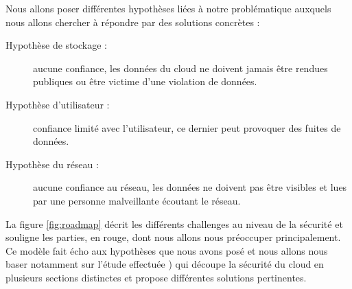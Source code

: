 Nous allons poser différentes hypothèses liées à notre problématique auxquels nous allons chercher à répondre par des solutions concrètes :
\begin{description}
	 \item[Hypothèse de stockage :] aucune confiance, les données du cloud ne
         doivent jamais être rendues publiques ou être victime d'une violation
         de données.
	 \item[Hypothèse d'utilisateur :] confiance limité avec l'utilisateur, ce dernier peut provoquer des fuites de données.
	 \item[Hypothèse du réseau :] aucune confiance au réseau, les données ne doivent pas être visibles et lues par une personne malveillante écoutant le réseau.
\end{description}

La figure \ref{fig:roadmap} décrit les différents challenges au niveau de la sécurité et souligne les parties, en rouge, dont nous allons nous préoccuper principalement. Ce modèle fait écho aux hypothèses que nous avons posé et nous allons nous baser notamment sur l'étude effectuée \cite{security_cloud_survey}) qui découpe la sécurité du cloud en plusieurs sections distinctes et propose différentes solutions pertinentes.

